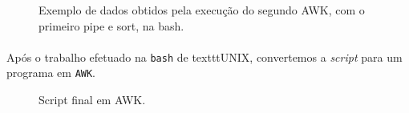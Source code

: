 \documentclass[11pt,a4paper]{report}
\begin{document}
\begin{figure}[H]
\centering
\noindent{}
\caption{Exemplo de dados obtidos pela execução do segundo AWK, com o primeiro pipe e sort, na bash.}
\end{figure}

\paragraph*{}Após o trabalho efetuado na \texttt{bash} de texttt{UNIX}, convertemos a \textit{script} para um programa em \texttt{AWK}.

\begin{figure}[H]
\centering
\noindent{}
\caption{Script final em AWK.}
\end{figure}
\end{document}
